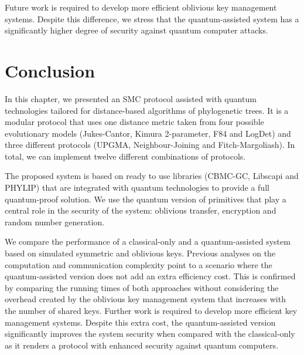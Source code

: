 Future work is required to develop more efficient oblivious key management systems. Despite this difference, we stress that the quantum-assisted system has a significantly higher degree of security against quantum computer attacks.




\section{Conclusion}

In this chapter, we presented an SMC protocol assisted with quantum technologies tailored for distance-based algorithms of phylogenetic trees. It is a modular protocol that uses one distance metric taken from four possible evolutionary models (Jukes-Cantor, Kimura 2-parameter, F84 and LogDet) and three different protocols (UPGMA, Neighbour-Joining and Fitch-Margoliash). In total, we can implement twelve different combinations of protocols.

The proposed system is based on ready to use libraries (CBMC-GC, Libscapi and PHYLIP) that are integrated with quantum technologies to provide a full quantum-proof solution. We use the quantum version of primitives that play a central role in the security of the system: oblivious transfer, encryption and random number generation.

We compare the performance of a classical-only and a quantum-assisted system based on simulated symmetric and oblivious keys. Previous analyses on the computation and communication complexity point to a scenario where the quantum-assisted version does not add an extra efficiency cost. This is confirmed by comparing the running times of both approaches without considering the overhead created by the oblivious key management system that increases with the number of shared keys. Further work is required to develop more efficient key management systems. Despite this extra cost, the quantum-assisted version significantly improves the system security when compared with the classical-only as it renders a protocol with enhanced security against quantum computers.








%
%
%
